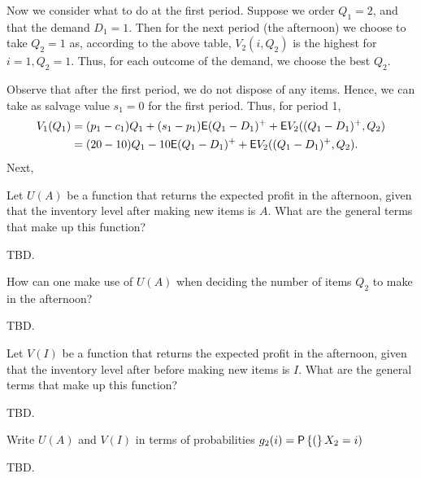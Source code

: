 \begin{question}
\begin{solution}
Now we consider what to do at the first period. Suppose we order $Q_1=2$, and that the demand $D_1=1$. Then for the next period (the afternoon) we choose to take $Q_2=1$ as, according to the above table, $V_2(i, Q_2)$ is the highest for $i=1, Q_2=1$.  Thus, for each outcome of the demand, we choose the best $Q_2$.  

Observe that after the first period, we do not dispose of any items. Hence, we can take as salvage value $s_1=0$ for the first period.  Thus, for period 1, 
\begin{equation*}
  \begin{split}
    V_1(Q_1) 
&= (p_1-c_1) Q_1 + (s_1-p_1)\mathsf{E} (Q_1-D_1)^+ + \mathsf{E} V_2((Q_1-D_1)^+, Q_2) \\
&= (20-10) Q_1 -10 \mathsf{E} (Q_1-D_1)^+ + \mathsf{E} V_2((Q_1-D_1)^+, Q_2).
  \end{split}
\end{equation*}
Next, 



\end{solution}

\end{question}

\begin{question}
Let $U(A)$ be a function that returns the expected profit in the afternoon, given that the inventory level after making new items is $A$. What are the general terms that make up this function?
   \begin{solution}
     TBD.
   \end{solution}
\end{question}

\begin{question}
How can one make use of $U(A)$ when deciding the number of items $Q_2$ to make in the afternoon?
   \begin{solution}
     TBD.
   \end{solution}
\end{question}

\begin{question}
Let $V(I)$ be a function that returns the expected profit in the afternoon, given that the inventory level after before making new items is $I$. What are the general terms that make up this function?
   \begin{solution}
     TBD.
   \end{solution}
\end{question}

\begin{question}
Write $U(A)$ and $V(I)$ in terms of probabilities $g_2(i)=\P(X_2=i)$
   \begin{solution}
     TBD.
   \end{solution}
\end{question}

